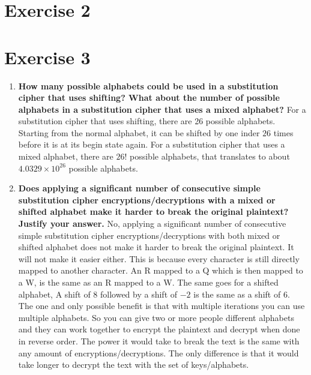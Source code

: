 \documentclass{report}
\begin{document}
\section*{Exercise 2}

\section*{Exercise 3}

\begin{enumerate}
      \item \textbf{How many possible alphabets could be used in a substitution cipher that uses shifting?
                  What about the number of possible alphabets in a substitution cipher that uses a mixed alphabet?
            }
            For a substitution cipher that uses shifting, there are 26 possible alphabets.
            Starting from the normal alphabet, it can be shifted by one inder $26$ times before it is at its begin state again.
            For a substitution cipher that uses a mixed alphabet, there are $26!$ possible alphabets,
            that translates to about $4.0329 \times 10^{26}$ possible alphabets.

      \item \textbf{Does applying a significant number of consecutive simple substitution cipher
                  encryptions/decryptions with a mixed or shifted alphabet make it harder to break the original plaintext?
                  Justify your answer.
            }
            No, applying a significant number of consecutive simple substitution cipher encryptions/decryptions
            with both mixed or shifted alphabet does not make it harder to break the original plaintext.
            It will not make it easier either.
            This is because every character is still directly mapped to another character.
            An R mapped to a Q which is then mapped to a W, is the same as an R mapped to a W.
            The same goes for a shifted alphabet, A shift of $8$ followed by a shift of $-2$ is the same as a shift of $6$.
            The one and only possible benefit is that with multiple iterations you can use multiple alphabets.
            So you can give two or more people different alphabets and they can work together to encrypt the plaintext
            and decrypt when done in reverse order. The power it would take to break the text is the same with any
            amount of encryptions/decryptions. The only difference is that it would take longer to decrypt the text with the set of keys/alphabets.


\end{enumerate}
\end{document}
